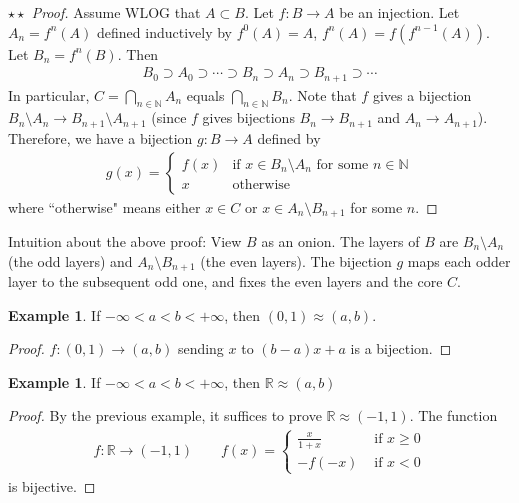 \documentclass[12pt,b5paper,notitlepage]{article}
\theoremstyle{definition}
\newtheorem{eg}[df]{Example}
\theoremstyle{plain}
\newcommand{\Nbb}{\mathbb N}
\newcommand{\Rbb}{\mathbb R}
\numberwithin{equation}{section}
\begin{document}
\begin{proof}[$\star\star$ Proof]
Assume WLOG that $A\subset B$. Let $f:B\rightarrow A$ be an injection. Let $A_n=f^n(A)$ defined inductively by $f^0(A)=A$, $f^n(A)=f(f^{n-1}(A))$. Let $B_n=f^n(B)$. Then
\begin{align*}
B_0\supset A_0\supset \cdots\supset B_n\supset A_n\supset B_{n+1}\supset\cdots
\end{align*}
In particular, $C=\bigcap_{n\in\Nbb}A_n$ equals $\bigcap_{n\in\Nbb}B_n$. Note that $f$ gives a bijection $B_n\setminus A_n\rightarrow B_{n+1}\setminus A_{n+1}$ (since $f$ gives bijections $B_n\rightarrow B_{n+1}$ and $A_n\rightarrow A_{n+1}$). Therefore, we have a bijection $g:B\rightarrow A$ defined by
\begin{gather*}
g(x)=\left\{
{\begin{array}{ll}
f(x)&\text{if $x\in B_n\setminus A_n$ for some $n\in\Nbb$}\\[0.5ex]
x&\text{otherwise}
\end{array}}
\right.
\end{gather*}
where ``otherwise" means either $x\in C$ or $x\in A_n\setminus B_{n+1}$ for some $n$.
\end{proof}

Intuition about the above proof: View $B$ as an onion. The layers of $B$ are $B_n\setminus A_n$ (the odd layers) and $A_n\setminus B_{n+1}$ (the even layers). The bijection $g$ maps each odder layer to the subsequent odd one, and fixes the even layers and the core $C$.


\begin{eg}\label{lb6}
If $-\infty<a<b<+\infty$, then $(0,1)\approx (a,b)$.
\end{eg}
\begin{proof}
$f:(0,1)\rightarrow (a,b)$ sending $x$ to $(b-a)x+a$ is a bijection.
\end{proof}

\begin{eg}\label{lb7}
If $-\infty<a<b<+\infty$, then $\Rbb\approx (a,b)$
\end{eg}

\begin{proof}
By the previous example, it suffices to prove $\Rbb\approx(-1,1)$. The function
\begin{gather}\label{eq20}
f:\Rbb\rightarrow(-1,1)\qquad f(x)=\left\{
\begin{array}{ll}
\frac x{1+x}&\text{ if $x\geq0$}\\[0.5ex]
-f(-x)&\text{ if $x<0$}
\end{array}
\right.
\end{gather}
is bijective.
\end{proof}
\end{document}
